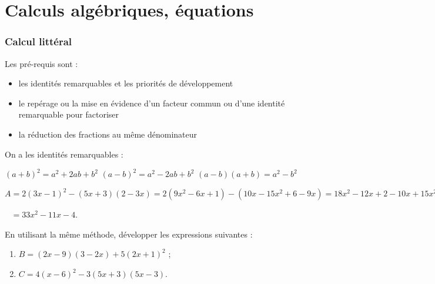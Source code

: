 \documentclass[a4paper,11pt]{article}
\author{Pierquet}
\title{\nomfichier}
\begin{document}
\pagestyle{fancy}


\part{Calculs algébriques, équations}

\medskip

\section{Calcul littéral}

\begin{cintro}
Les pré-requis sont :
\begin{itemize}[label=\small\faInfoCircle]
	\item les identités remarquables et les priorités de développement
	\item le repérage ou la mise en évidence d'un facteur commun ou d'une identité remarquable pour factoriser
	\item la réduction des fractions au même dénominateur
\end{itemize}
\end{cintro}

\begin{cprop}[s]
On a les identités remarquables :

\qquad $(a+b)^2=a^2+2ab+b^2$ \qquad $(a-b)^2=a^2-2ab+b^2$ \qquad $(a-b)(a+b)=a^2-b^2$
\end{cprop}

\begin{cexemple}[ - Développement]
$A=2(3x-1)^2-(5x+3)(2-3x)=2(9x^2-6x+1)-(10x-15x^2+6-9x) = 18x^2-12x+2-10x+15x^2-6+9x$

$\phantom{A}=33x^2-11x-4$.
\end{cexemple}

\begin{cexercice}
En utilisant la même méthode, développer les expressions suivantes :
\vspace*{-0.12cm}
\begin{enumerate}
	\item $B=(2x-9)(3-2x)+5(2x+1)^2$ ;
	\item $C=4(x-6)^2-3(5x+3)(5x-3)$.
\end{enumerate}
\end{cexercice}
\end{document}
